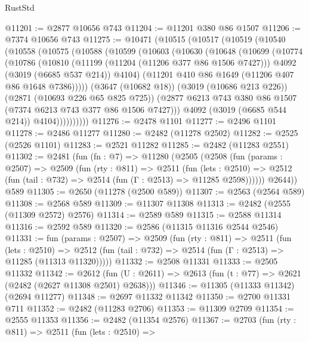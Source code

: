 \begin{lexlean}{RustStd}
\begin{coremodule}
@11201 := @2877 @10656 @743
@11204 := @11201 @380 @86 @1507
@11206 := @7374 @10656 @743
@11275 := @10471
    (@10515
      (@10517
        (@10519
          (@10540
            (@10558
              (@10575
                (@10588
                  (@10599
                    (@10603
                      (@10630
                        (@10648
                          (@10699
                            (@10774
                              (@10786
                                (@10810
                                  (@11199 (@11204 (@11206 @377 @86 @1506 @7427)))
                                  @4092
                                  (@3019 (@6685 @537 @214))
                                  @4104)
                                (@11201 @410 @86 @1649 (@11206 @407 @86 @1648 @7386)))))
                          (@3647 (@10682 @18))
                          (@3019 (@10686 @213 @226))
                          (@2871 (@10693 @226 @65 @825 @725))
                          (@2877 @6213 @743 @380 @86 @1507 (@7374 @6213 @743 @377 @86 @1506 @7427)))
                        @4092
                        (@3019 (@6685 @544 @214))
                        @4104))))))))))
@11276 := @2478 @1101
@11277 := @2496 @1101
@11278 := @2486 @11277
@11280 := @2482 (@11278 @2502)
@11282 := @2525 (@2526 @1101)
@11283 := @2521 @11282
@11285 := @2482 (@11283 @2551)
@11302 := @2481
    (fun (fn : @7) =>
    @11280
      (@2505
        (@2508
          (fun (params : @2507) =>
          @2509
            (fun (rty : @811) =>
            @2511
              (fun (lets : @2510) =>
              @2512 (fun (tail : @732) => @2514 (fun (Γ : @2513) => @11285 @2598))))))
        @2644))
    @589
@11305 := @2650 (@11278 (@2500 @589))
@11307 := @2563 (@2564 @589)
@11308 := @2568 @589
@11309 := @11307 @11308
@11313 := @2482 (@2555 (@11309 @2572) @2576)
@11314 := @2589 @589
@11315 := @2588 @11314
@11316 := @2592 @589
@11320 := @2586 (@11315 @11316 @2544 @2546)
@11331 := fun (params : @2507) =>
  @2509
    (fun (rty : @811) =>
    @2511
      (fun (lets : @2510) =>
      @2512 (fun (tail : @732) => @2514 (fun (Γ : @2513) => @11285 (@11313 @11320)))))
@11332 := @2508 @11331
@11333 := @2505 @11332
@11342 := @2612
    (fun (U : @2611) => @2613 (fun (t : @77) => @2621 (@2482 (@2627 @11308 @2501) @2638)))
@11346 := @11305 (@11333 @11342) (@2694 @11277)
@11348 := @2697 @11332 @11342
@11350 := @2700 @11331 @711
@11352 := @2482 (@11283 @2706)
@11353 := @11309 @2709
@11354 := @2555 @11353
@11356 := @2482 (@11354 @2576)
@11367 := @2703
    (fun (rty : @811) =>
    @2511
      (fun (lets : @2510) =>

\end{coremodule}
\end{lexlean}
